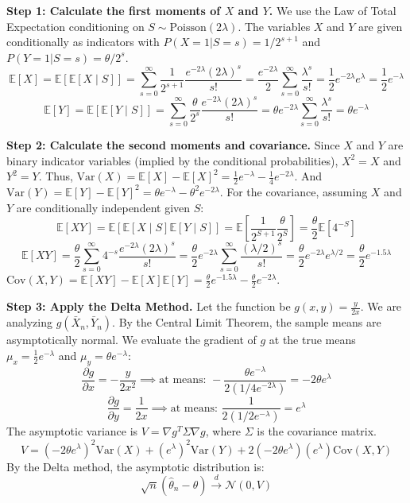 \begin{solution}
\textbf{Step 1: Calculate the first moments of $X$ and $Y$.}
We use the Law of Total Expectation conditioning on $S \sim \text{Poisson}(2\lambda)$. The variables $X$ and $Y$ are given conditionally as indicators with $P(X=1|S=s) = 1/2^{s+1}$ and $P(Y=1|S=s) = \theta/2^s$.
\[ \mathbb{E}[X] = \mathbb{E}[\mathbb{E}[X \mid S]] = \sum_{s=0}^\infty \frac{1}{2^{s+1}} \frac{e^{-2\lambda} (2\lambda)^s}{s!} = \frac{e^{-2\lambda}}{2} \sum_{s=0}^\infty \frac{\lambda^s}{s!} = \frac{1}{2} e^{-2\lambda} e^\lambda = \frac{1}{2} e^{-\lambda} \]
\[ \mathbb{E}[Y] = \mathbb{E}[\mathbb{E}[Y \mid S]] = \sum_{s=0}^\infty \frac{\theta}{2^s} \frac{e^{-2\lambda} (2\lambda)^s}{s!} = \theta e^{-2\lambda} \sum_{s=0}^\infty \frac{\lambda^s}{s!} = \theta e^{-\lambda} \]

\textbf{Step 2: Calculate the second moments and covariance.}
Since $X$ and $Y$ are binary indicator variables (implied by the conditional probabilities), $X^2 = X$ and $Y^2 = Y$.
Thus, $\text{Var}(X) = \mathbb{E}[X] - \mathbb{E}[X]^2 = \frac{1}{2} e^{-\lambda} - \frac{1}{4} e^{-2\lambda}$.
And $\text{Var}(Y) = \mathbb{E}[Y] - \mathbb{E}[Y]^2 = \theta e^{-\lambda} - \theta^2 e^{-2\lambda}$.
For the covariance, assuming $X$ and $Y$ are conditionally independent given $S$:
\[ \mathbb{E}[XY] = \mathbb{E}[\mathbb{E}[X \mid S]\mathbb{E}[Y \mid S]] = \mathbb{E}\left[ \frac{1}{2^{S+1}} \frac{\theta}{2^S} \right] = \frac{\theta}{2} \mathbb{E}\left[ 4^{-S} \right] \]
\[ \mathbb{E}[XY] = \frac{\theta}{2} \sum_{s=0}^\infty 4^{-s} \frac{e^{-2\lambda} (2\lambda)^s}{s!} = \frac{\theta}{2} e^{-2\lambda} \sum_{s=0}^\infty \frac{(\lambda/2)^s}{s!} = \frac{\theta}{2} e^{-2\lambda} e^{\lambda/2} = \frac{\theta}{2} e^{-1.5\lambda} \]
$\text{Cov}(X,Y) = \mathbb{E}[XY] - \mathbb{E}[X]\mathbb{E}[Y] = \frac{\theta}{2} e^{-1.5\lambda} - \frac{\theta}{2} e^{-2\lambda}$.

\textbf{Step 3: Apply the Delta Method.}
Let the function be $g(x, y) = \frac{y}{2x}$. We are analyzing $g(\bar{X}_n, \bar{Y}_n)$.
By the Central Limit Theorem, the sample means are asymptotically normal.
We evaluate the gradient of $g$ at the true means $\mu_x = \frac{1}{2} e^{-\lambda}$ and $\mu_y = \theta e^{-\lambda}$:
\[ \frac{\partial g}{\partial x} = -\frac{y}{2x^2} \implies \text{at means: } -\frac{\theta e^{-\lambda}}{2(1/4 e^{-2\lambda})} = -2\theta e^\lambda \]
\[ \frac{\partial g}{\partial y} = \frac{1}{2x} \implies \text{at means: } \frac{1}{2(1/2 e^{-\lambda})} = e^\lambda \]
The asymptotic variance is $V = \nabla g^T \Sigma \nabla g$, where $\Sigma$ is the covariance matrix.
\[ V = \left(-2\theta e^\lambda\right)^2 \text{Var}(X) + \left(e^\lambda\right)^2 \text{Var}(Y) + 2(-2\theta e^\lambda)(e^\lambda)\text{Cov}(X,Y) \]
By the Delta method, the asymptotic distribution is:
\[ \sqrt{n}(\hat{\theta}_n - \theta) \xrightarrow{d} \mathcal{N}(0, V) \]


\end{solution}
